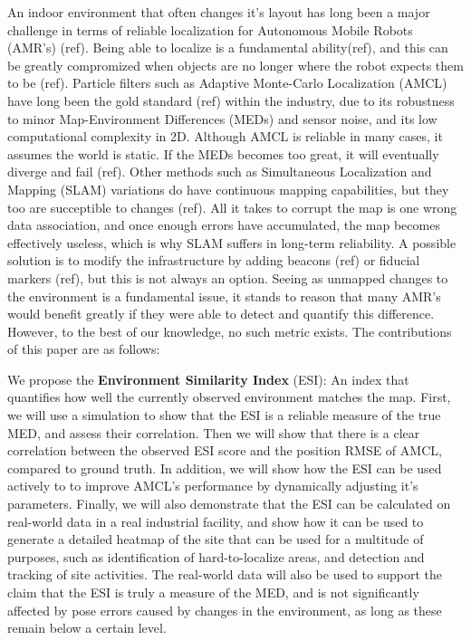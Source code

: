 An indoor environment that often changes it's layout has long been a major challenge in terms of reliable localization for Autonomous Mobile Robots (AMR's) (ref). 
Being able to localize is a fundamental ability(ref), and this can be greatly compromized when objects are 
no longer where the robot expects them to be (ref). Particle filters such as Adaptive Monte-Carlo Localization (AMCL) have long been the gold standard (ref) within the 
industry, due to its robustness to minor Map-Environment Differences (MEDs) and sensor noise, and its low computational complexity in 2D. Although AMCL is 
reliable in many cases, it assumes the world is static. If the MEDs becomes too great, it will eventually diverge and fail (ref).
Other methods such as Simultaneous Localization and Mapping (SLAM) variations do have continuous mapping capabilities, 
but they too are succeptible to changes (ref). All it takes to corrupt the map is one wrong data association, and once enough errors have accumulated, 
the map becomes effectively useless, which is why SLAM suffers in long-term reliability. A possible solution is to modify the infrastructure by adding
beacons (ref) or fiducial markers (ref), but this is not always an option.
Seeing as unmapped changes to the environment is a fundamental issue, it stands to reason that many AMR's would
benefit greatly if they were able to detect and quantify this difference. 
However, to the best of our knowledge, no such metric exists. The contributions of this paper are as follows:

We propose the \textbf{Environment Similarity Index} (ESI): An index that quantifies how well the currently observed environment matches the map.
First, we will use a simulation to show that the ESI is a reliable measure of the true MED, and assess their correlation.
Then we will show that there is a clear correlation between the observed ESI score and the position RMSE of AMCL, compared to ground truth.
In addition, we will show how the ESI can be used actively to to improve AMCL's performance by dynamically adjusting it's parameters.
Finally, we will also demonstrate that the ESI can be calculated on real-world data in a real industrial facility, and show how
it can be used to generate a detailed heatmap of the site that can be used for a multitude of purposes, such as identification of
hard-to-localize areas, and detection and tracking of site activities. The real-world data will also be used to support the claim that the ESI
is truly a measure of the MED, and is not significantly affected by pose errors caused by changes in the environment, as long as
these remain below a certain level.

